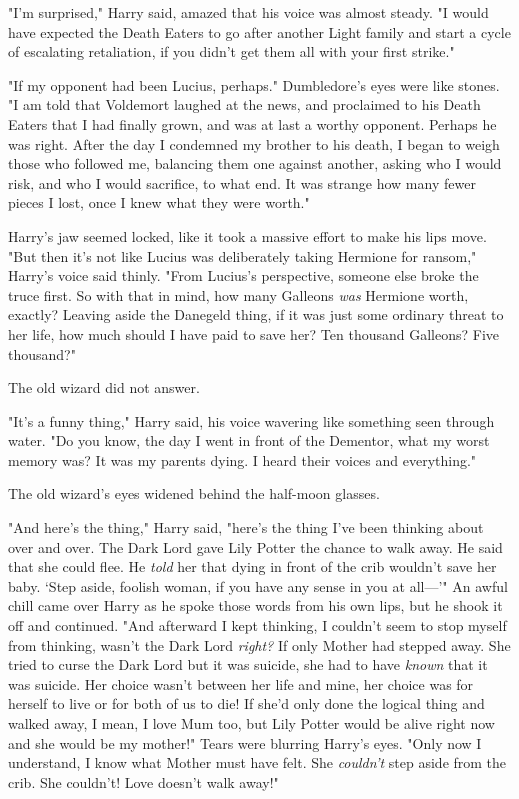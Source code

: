 "I'm surprised," Harry said, amazed that his voice was almost steady. "I would 
have expected the Death Eaters to go after another Light family and start a 
cycle of escalating retaliation, if you didn't get them all with your first 
strike."

"If my opponent had been Lucius, perhaps." Dumbledore's eyes were like stones. 
"I am told that Voldemort laughed at the news, and proclaimed to his Death 
Eaters that I had finally grown, and was at last a worthy opponent. Perhaps he 
was right. After the day I condemned my brother to his death, I began to weigh 
those who followed me, balancing them one against another, asking who I would 
risk, and who I would sacrifice, to what end. It was strange how many fewer 
pieces I lost, once I knew what they were worth."

Harry's jaw seemed locked, like it took a massive effort to make his lips move. 
"But then it's not like Lucius was deliberately taking Hermione for ransom," 
Harry's voice said thinly. "From Lucius's perspective, someone else broke the 
truce first. So with that in mind, how many Galleons \emph{was} Hermione worth, 
exactly? Leaving aside the Danegeld thing, if it was just some ordinary threat 
to her life, how much should I have paid to save her? Ten thousand Galleons? 
Five thousand?"

The old wizard did not answer.

"It's a funny thing," Harry said, his voice wavering like something seen 
through water. "Do you know, the day I went in front of the Dementor, what my 
worst memory was? It was my parents dying. I heard their voices and everything."

The old wizard's eyes widened behind the half-moon glasses.

"And here's the thing," Harry said, "here's the thing I've been thinking about 
over and over. The Dark Lord gave Lily Potter the chance to walk away. He said 
that she could flee. He \emph{told} her that dying in front of the crib 
wouldn't save her baby. `Step aside, foolish woman, if you have any sense in 
you at all---'" An awful chill came over Harry as he spoke those words from his 
own lips, but he shook it off and continued. "And afterward I kept thinking, I 
couldn't seem to stop myself from thinking, wasn't the Dark Lord \emph{right?} 
If only Mother had stepped away. She tried to curse the Dark Lord but it was 
suicide, she had to have \emph{known} that it was suicide. Her choice wasn't 
between her life and mine, her choice was for herself to live or for both of us 
to die! If she'd only done the logical thing and walked away, I mean, I love 
Mum too, but Lily Potter would be alive right now and she would be my mother!" 
Tears were blurring Harry's eyes. "Only now I understand, I know what Mother 
must have felt. She \emph{couldn't} step aside from the crib. She couldn't! 
Love doesn't walk away!"


